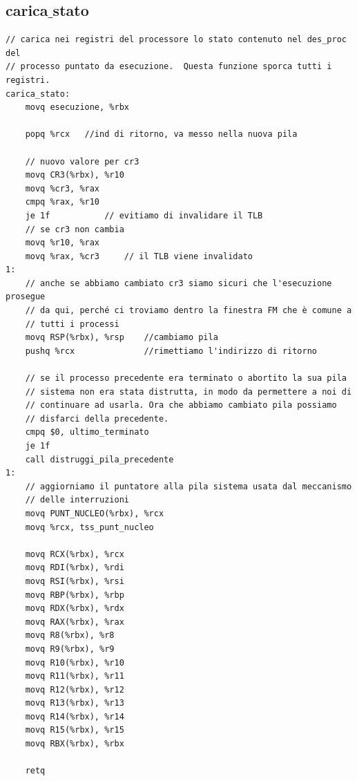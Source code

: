 \documentclass[11pt]{report}
\theoremstyle{definition}
\begin{document}
\subsection{carica$\_$stato}
\small 
\begin{verbatim}
// carica nei registri del processore lo stato contenuto nel des_proc del
// processo puntato da esecuzione.  Questa funzione sporca tutti i registri.
carica_stato:
    movq esecuzione, %rbx

    popq %rcx   //ind di ritorno, va messo nella nuova pila

    // nuovo valore per cr3
    movq CR3(%rbx), %r10
    movq %cr3, %rax
    cmpq %rax, %r10
    je 1f			// evitiamo di invalidare il TLB
    // se cr3 non cambia
    movq %r10, %rax
    movq %rax, %cr3		// il TLB viene invalidato
1:
    // anche se abbiamo cambiato cr3 siamo sicuri che l'esecuzione prosegue
    // da qui, perché ci troviamo dentro la finestra FM che è comune a
    // tutti i processi
    movq RSP(%rbx), %rsp    //cambiamo pila
    pushq %rcx              //rimettiamo l'indirizzo di ritorno

    // se il processo precedente era terminato o abortito la sua pila
    // sistema non era stata distrutta, in modo da permettere a noi di
    // continuare ad usarla. Ora che abbiamo cambiato pila possiamo
    // disfarci della precedente.
    cmpq $0, ultimo_terminato
    je 1f
    call distruggi_pila_precedente
1:
    // aggiorniamo il puntatore alla pila sistema usata dal meccanismo
    // delle interruzioni
    movq PUNT_NUCLEO(%rbx), %rcx
    movq %rcx, tss_punt_nucleo

    movq RCX(%rbx), %rcx
    movq RDI(%rbx), %rdi
    movq RSI(%rbx), %rsi
    movq RBP(%rbx), %rbp
    movq RDX(%rbx), %rdx
    movq RAX(%rbx), %rax
    movq R8(%rbx), %r8
    movq R9(%rbx), %r9
    movq R10(%rbx), %r10
    movq R11(%rbx), %r11
    movq R12(%rbx), %r12
    movq R13(%rbx), %r13
    movq R14(%rbx), %r14
    movq R15(%rbx), %r15
    movq RBX(%rbx), %rbx

    retq
\end{verbatim}
\normalsize 
\end{document}
